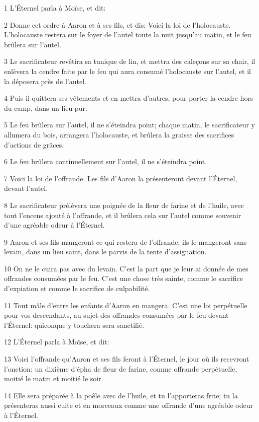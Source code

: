 \par 1 L'Éternel parla à Moïse, et dit:
\par 2 Donne cet ordre à Aaron et à ses fils, et dis: Voici la loi de l'holocauste. L'holocauste restera sur le foyer de l'autel toute la nuit jusqu'au matin, et le feu brûlera sur l'autel.
\par 3 Le sacrificateur revêtira sa tunique de lin, et mettra des caleçons sur sa chair, il enlèvera la cendre faite par le feu qui aura consumé l'holocauste sur l'autel, et il la déposera près de l'autel.
\par 4 Puis il quittera ses vêtements et en mettra d'autres, pour porter la cendre hors du camp, dans un lieu pur.
\par 5 Le feu brûlera sur l'autel, il ne s'éteindra point; chaque matin, le sacrificateur y allumera du bois, arrangera l'holocauste, et brûlera la graisse des sacrifices d'actions de grâces.
\par 6 Le feu brûlera continuellement sur l'autel, il ne s'éteindra point.
\par 7 Voici la loi de l'offrande. Les fils d'Aaron la présenteront devant l'Éternel, devant l'autel.
\par 8 Le sacrificateur prélèvera une poignée de la fleur de farine et de l'huile, avec tout l'encens ajouté à l'offrande, et il brûlera cela sur l'autel comme souvenir d'une agréable odeur à l'Éternel.
\par 9 Aaron et ses fils mangeront ce qui restera de l'offrande; ils le mangeront sans levain, dans un lieu saint, dans le parvis de la tente d'assignation.
\par 10 On ne le cuira pas avec du levain. C'est la part que je leur ai donnée de mes offrandes consumées par le feu. C'est une chose très sainte, comme le sacrifice d'expiation et comme le sacrifice de culpabilité.
\par 11 Tout mâle d'entre les enfants d'Aaron en mangera. C'est une loi perpétuelle pour vos descendants, au sujet des offrandes consumées par le feu devant l'Éternel: quiconque y touchera sera sanctifié.
\par 12 L'Éternel parla à Moïse, et dit:
\par 13 Voici l'offrande qu'Aaron et ses fils feront à l'Éternel, le jour où ils recevront l'onction: un dixième d'épha de fleur de farine, comme offrande perpétuelle, moitié le matin et moitié le soir.
\par 14 Elle sera préparée à la poêle avec de l'huile, et tu l'apporteras frite; tu la présenteras aussi cuite et en morceaux comme une offrande d'une agréable odeur à l'Éternel.
